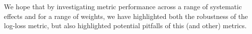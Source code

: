 We hope that by investigating metric performance across a range of systematic effects and for a range of weights, we have highlighted both the robustness of the log-loss metric, but also highlighted potential pitfalls of this (and other) metrics.

